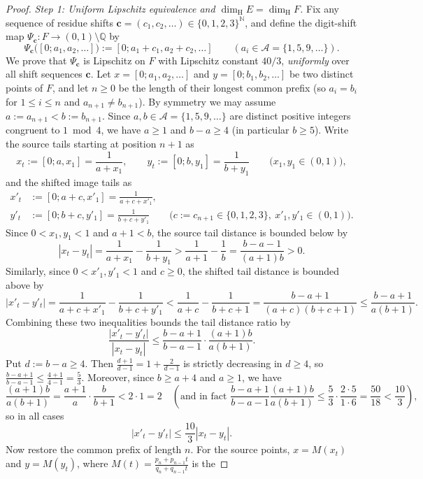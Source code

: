 \documentclass[11pt]{article}
\theoremstyle{definition}
\theoremstyle{remark}
\newcommand{\N}{\mathbb{N}}
\newcommand{\Q}{\mathbb{Q}}
\newcommand{\dimH}{\dim_{\mathrm{H}}}
\begin{document}
\begin{proof}
\emph{Step 1: Uniform Lipschitz equivalence and $\dimH E=\dimH F$.}
Fix any sequence of residue shifts $\mathbf c=(c_1,c_2,\dots)\in\{0,1,2,3\}^{\N}$,
and define the digit-shift map $\Psi_{\mathbf c}:F\to(0,1)\setminus\Q$ by
\[
\Psi_{\mathbf c}\bigl([0;a_1,a_2,\dots]\bigr):=[0;a_1+c_1,a_2+c_2,\dots]
\qquad(a_i\in\mathcal A=\{1,5,9,\dots\}).
\]
We prove that $\Psi_{\mathbf c}$ is Lipschitz on $F$ with Lipschitz constant
$40/3$, \emph{uniformly} over all shift sequences $\mathbf c$. Let
$x=[0;a_1,a_2,\dots]$ and $y=[0;b_1,b_2,\dots]$ be two distinct points of $F$,
and let $n\ge0$ be the length of their longest common prefix (so $a_i=b_i$ for
$1\le i\le n$ and $a_{n+1}\ne b_{n+1}$). By symmetry we may assume
$a:=a_{n+1}<b:=b_{n+1}$. Since $a,b\in\mathcal A=\{1,5,9,\dots\}$ are distinct
positive integers congruent to $1\bmod4$, we have $a\ge1$ and $b-a\ge4$ (in
particular $b\ge5$). Write the source tails starting at position $n+1$ as
\[
x_t:=[0;a,x_1]=\frac{1}{a+x_1},\qquad
y_t:=[0;b,y_1]=\frac{1}{b+y_1}\qquad\bigl(x_1,y_1\in(0,1)\bigr),
\]
and the shifted image tails as
\begin{align*}
x'_t&:=[0;a+c,x'_1]=\frac{1}{a+c+x'_1},\\
y'_t&:=[0;b+c,y'_1]=\frac{1}{b+c+y'_1}\qquad\bigl(c:=c_{n+1}\in\{0,1,2,3\},\ x'_1,y'_1\in(0,1)\bigr).
\end{align*}
Since $0<x_1,y_1<1$ and $a+1<b$, the source tail distance is bounded below by
\[
|x_t-y_t|=\frac{1}{a+x_1}-\frac{1}{b+y_1}
>\frac{1}{a+1}-\frac{1}{b}=\frac{b-a-1}{(a+1)b}>0.
\]
Similarly, since $0<x'_1,y'_1<1$ and $c\ge0$, the shifted tail distance is
bounded above by
\[
|x'_t-y'_t|=\frac{1}{a+c+x'_1}-\frac{1}{b+c+y'_1}
<\frac{1}{a+c}-\frac{1}{b+c+1}=\frac{b-a+1}{(a+c)(b+c+1)}
\le\frac{b-a+1}{a(b+1)}.
\]
Combining these two inequalities bounds the tail distance ratio by
\[
\frac{|x'_t-y'_t|}{|x_t-y_t|}
\le\frac{b-a+1}{b-a-1}\cdot\frac{(a+1)b}{a(b+1)}.
\]
Put $d:=b-a\ge4$. Then $\frac{d+1}{d-1}=1+\frac{2}{d-1}$ is strictly decreasing
in $d\ge4$, so $\frac{b-a+1}{b-a-1}\le\frac{4+1}{4-1}=\frac53$. Moreover,
since $b\ge a+4$ and $a\ge1$, we have
\[
\frac{(a+1)b}{a(b+1)}
=\frac{a+1}{a}\cdot\frac{b}{b+1}
<2\cdot1=2
\quad\left(\text{and in fact }\frac{b-a+1}{b-a-1}\frac{(a+1)b}{a(b+1)}\le\frac53\cdot\frac{2\cdot5}{1\cdot6}=\frac{50}{18}<\frac{10}{3}\right),
\]
so in all cases
\[
|x'_t-y'_t|\le\frac{10}{3}|x_t-y_t|.
\]
Now restore the common prefix of length $n$. For the source points,
$x=M(x_t)$ and $y=M(y_t)$, where $M(t)=\frac{p_n+p_{n-1}t}{q_n+q_{n-1}t}$ is the

\end{proof}
\end{document}
